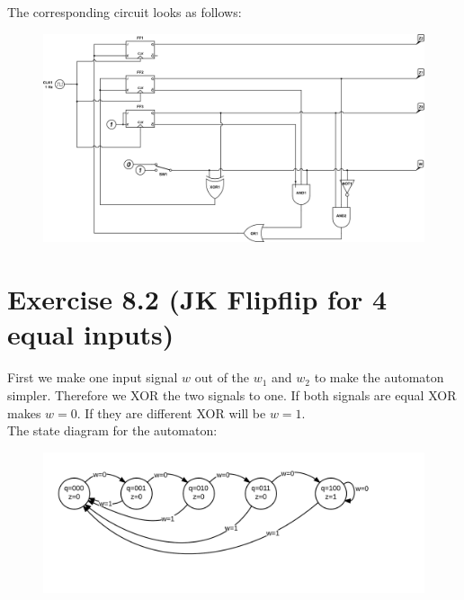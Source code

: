 \documentclass[10pt,a4paper]{scrartcl}
\newcommand{\subExercise}[1]{\vspace{0.5em} \noindent{\bf #1)}}
\begin{document}
\subExercise{b}
The corresponding circuit looks as follows:
\begin{figure}[h]
  \centering\includegraphics[width=\textwidth]{images/8_1-ringcounter-jk.png} 
\end{figure}

\FloatBarrier
\section*{Exercise 8.2 (JK Flipflip for 4 equal inputs)}

First we make one input signal $w$ out of the $w_1$ and $w_2$ to make the automaton simpler. Therefore we XOR the two signals to one.
If both signals are equal XOR makes $w=0$. If they are different XOR will be $w=1$.\\
The state diagram for the automaton:

\begin{figure}[h]
\includegraphics[width=\textwidth]{images/8_2-automat.png} 
\end{figure}
\end{document}
